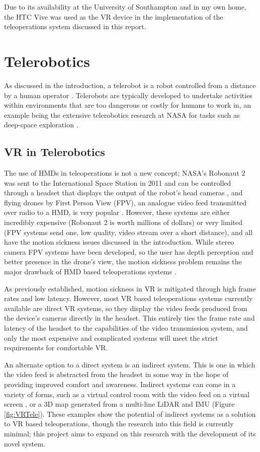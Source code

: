 Due to its availability at the University of Southampton and in my own home, the HTC Vive was used as the VR device in the implementation of the teleoperations system discussed in this report. 

\section{Telerobotics}

As discussed in the introduction, a telerobot is a robot controlled from a distance by a human operator \cite{NAP4761}. Telerobots are typically developed to undertake activities within environments that are too dangerous or costly for humans to work in, an example being the extensive telerobotics research at NASA for tasks such as deep-space exploration \cite{fong2017interactive}.

\subsection{VR in Telerobotics}

The use of HMDs in teleoperations is not a new concept; NASA's Robonaut 2 was sent to the International Space Station in 2011 and can be controlled through a headset that displays the output of the robot's head cameras \cite{Robonaut}, and flying drones by First Person View (FPV), an analogue video feed transmitted over radio to a HMD, is very popular \cite{FPV}. However, these systems are either incredibly expensive (Robonaut 2 is worth millions of dollars) or very limited (FPV systems send one, low quality, video stream over a short distance), and all have the motion sickness issues discussed in the introduction. While stereo camera FPV systems have been developed, so the user has depth perception and better presence in the drone's view, the motion sickness problem remains the major drawback of HMD based teleoperations systems \cite{2FPV}.

As previously established, motion sickness in VR is mitigated through high frame rates and low latency. However, most VR based teleoperations systems currently available are direct VR systems, so they display the video feeds produced from the device's cameras directly in the headset. This entirely ties the frame rate and latency of the headset to the capabilities of the video transmission system, and only the most expensive and complicated systems will meet the strict requirements for comfortable VR.

An alternate option to a direct system is an indirect system. This is one in which the video feed is abstracted from the headset in some way in the hope of providing improved comfort and awareness. Indirect systems can come in a variety of forms, such as a virtual control room with the video feed on a virtual screen \cite{lipton2018baxter}, or a 3D map generated from a multi-line LiDAR and IMU \cite{wang2017novel} (Figure \ref{fig:VRTele}). These examples show the potential of indirect systems as a solution to VR based teleoperations, though the research into this field is currently minimal; this project aims to expand on this research with the development of its novel system.

